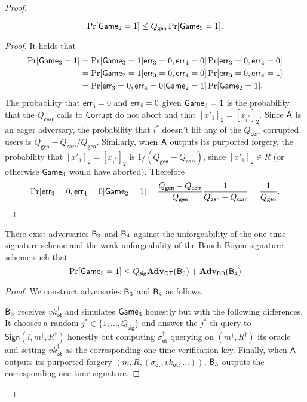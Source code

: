 \begin{proof}
\begin{lemma}
$$
\Pr[\mathsf{Game}_2=1]\leq Q_\mathsf{gen}\Pr[\mathsf{Game}_3=1].
$$
\end{lemma}
\begin{proof}
It holds that
\begin{align*}
\Pr[\mathsf{Game}_3=1] &= \Pr[\mathsf{Game}_3=1|\mathsf{err}_3=0,\mathsf{err}_4=0]\Pr[\mathsf{err}_3=0,\mathsf{err}_4=0]\\
&=\Pr[\mathsf{Game}_2=1|\mathsf{err}_3=0,\mathsf{err}_4=0]\Pr[\mathsf{err}_3=0,\mathsf{err}_4=1]\\
&=\Pr[\mathsf{err}_3=0,\mathsf{err}_4=0|\mathsf{Game}_2=1]\Pr[\mathsf{Game}_2=1].
\end{align*}
The probability that $\mathsf{err}_3=0$ and $\mathsf{err}_4=0$ given $\mathsf{Game}_3=1$ is the probability that the ${Q_\mathsf{corr}}$ calls to $\mathsf{Corrupt}$ do not abort and that $[x'_1]_2=[x_{i^*}]_2$. Since $\mathsf{A}$ is an eager adversary, the probability that $i^*$ doesn't hit any of the $Q_\mathsf{corr}$ corrupted users is $Q_\mathsf{gen}-Q_\mathsf{corr}/Q_\mathsf{gen}$. Similarly, when $\mathsf{A}$ outputs its purported forgery, the probability that $[x'_1]_2=[x_{i^*}]_2$ is $1/({Q_\mathsf{gen}}-{Q_\mathsf{corr}})$, since $[x'_1]_2\in R$ (or otherwise $\mathsf{Game}_3$ would have aborted). Therefore
$$
\Pr[\mathsf{err}_3=0,\mathsf{err}_4=0|\mathsf{Game}_2=1]=\frac{{Q_\mathsf{gen}}-Q_\mathsf{corr}}{{Q_\mathsf{gen}}}\frac{1}{{Q_\mathsf{gen}}-{Q_\mathsf{corr}}}=\frac{1}{{Q_\mathsf{gen}}}.
$$ 
\end{proof}

\begin{lemma}  There exist adversaries $\mathsf{B}_3$ and $\mathsf{B}_4$ against the unforgeability of the one-time signature scheme and the weak unforgeability of the Boneh-Boyen signature scheme such that
$$
\Pr[\mathsf{Game}_3=1]\leq Q_\mathsf{sig}\mathbf{Adv}_{\mathsf{OT}}(\mathsf{B}_3)+\mathbf{Adv}_{\mathsf{BB}}(\mathsf{B}_4)
$$
\end{lemma}
\begin{proof}
We construct adversaries $\mathsf{B}_3$ and $\mathsf{B}_4$ as follows.

$\mathsf{B}_3$ receives $vk_\mathsf{ot}^\dag$ and simulates $\mathsf{Game}_3$ honestly but with the following differences. It chooses a random $j^*\in\{1,\ldots, Q_\mathsf{sig}\}$ and answer the $j^*$ th query to $\mathsf{Sign}(i,m^\dag,R^\dag)$ honestly but computing $\sigma_\mathsf{ot}^\dag$ querying on $(m^\dag,R^\dag)$ its oracle and setting $vk_\mathsf{ot}^\dag$ as the corresponding one-time verification key. Finally, when $\mathsf{A}$ outputs its purported forgery $(m,R,(\sigma_\mathsf{ot},vk_\mathsf{ot},\ldots))$, $\mathsf{B}_3$ outputs the corresponding one-time signature.


\end{proof}
\end{proof}
